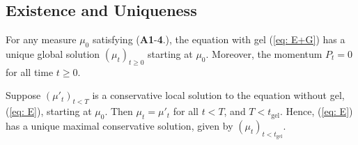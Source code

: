 \subsection{Existence and Uniqueness}

\begin{lemma}\label{lemma: E and U} For any measure $\mu_0$ satisfying (\textbf{A1}-\textbf{4}.), the equation with gel (\ref{eq: E+G}) has a unique global solution $(\mu_t)_{t\geq 0}$ starting at $\mu_0$. Moreover, the momentum $P_t=0$ for all time $t\ge 0$. \end{lemma}
\begin{corollary}\label{cor: maximal conservative solutions} Suppose $(\mu'_t)_{t<T}$ is a conservative local solution to the equation without gel, (\ref{eq: E}), starting at $\mu_0$. Then $\mu_t=\mu'_t$ for all $t<T$, and $T<t_\mathrm{gel}$. Hence, (\ref{eq: E}) has a unique maximal conservative solution, given by $(\mu_t)_{t<t_\mathrm{gel}}$.
\end{corollary}

